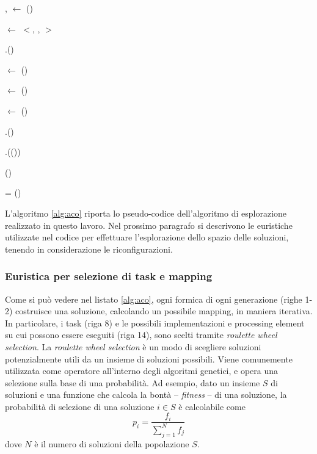 \begin{algorithm}[!htbp]
{{{{				\ForAll{\Pi $\in$ \pSet}{
					\pIiPi $\leftarrow$ \mappingHeuristic(\Ii, \Pi)
				}
			}
			\chosenI, \chosenP $\leftarrow$ \rouletteSelection(\pIP)
			
			\chosenTrace $\leftarrow$ $<$\chosenT, \chosenI, \chosenP$>$
			
			\mappingTrace.\add(\chosenTrace)
			
			\readySet $\leftarrow$ \resolveDependencies()
		}

		\antMetrics $\leftarrow$ \computeMetrics(\antA)
		
		\antObjective $\leftarrow$ \computeObjective(\antMetrics)
		
		\thisGenerationSolutions.\add(\ant)
	}
	\bestAnts.\add(\selectBest(\thisGenerationSolutions))
	
	\updateGlobalPheromones(\bestAnts)
}

\bestAnt = \selectBestAnt(\bestAnts)
		
\Return \bestAntTrace

\caption{Pseudo-codice dell'algoritmo di esplorazione.}
\label{alg:aco}
\end{algorithm}

L'algoritmo \ref{alg:aco} riporta lo pseudo-codice dell'algoritmo di esplorazione
realizzato in questo lavoro.
Nel prossimo paragrafo si descrivono le euristiche utilizzate nel codice per effettuare
l'esplorazione dello spazio delle soluzioni, tenendo in considerazione le riconfigurazioni.


\subsubsection{Euristica per selezione di task e mapping}
Come si pu\`o vedere nel listato \ref{alg:aco}, ogni formica di ogni generazione (righe 1-2)
costruisce una soluzione, calcolando un possibile mapping, in maniera iterativa. In particolare,
i task (riga 8)  e le possibili implementazioni e processing element su cui possono essere eseguiti
(riga 14), sono scelti tramite \emph{roulette wheel selection}. La \emph{roulette wheel
selection} \`e un modo di scegliere soluzioni potenzialmente utili da un insieme di soluzioni possibili.
Viene comunemente utilizzata come operatore all'interno degli algoritmi genetici, e opera una selezione
sulla base di una probabilit\`a. Ad esempio, dato un insieme $S$ di soluzioni e una funzione che calcola
la bont\`a -- \emph{fitness} -- di una soluzione, la probabilit\`a di selezione di una soluzione
$i \in S$ \`e calcolabile come
\begin{displaymath}
  p_i = \frac{f_i}{\sum_{j=1}^{N}f_j}
\end{displaymath}
dove $N$ \`e il numero di soluzioni della popolazione $S$.

